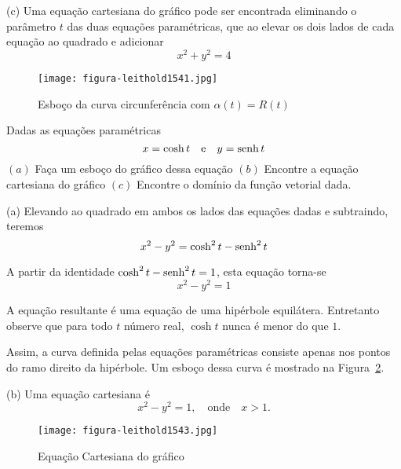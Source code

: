 (c) Uma equação cartesiana do gráfico pode ser encontrada eliminando o parâmetro \(t\) das duas equações paramétricas, que ao elevar os dois lados de cada equação ao quadrado e adicionar
\begin{equation*}
x^{2} + y^{2} = 4
\end{equation*}

\begin{figure}[H]
  \centering
  \texttt{[image: figura-leithold1541.jpg]}
  \caption{Esboço da curva circunferência com \(\alpha(t)=R(t)\)}\label{fig:1541}
\end{figure}


\begin{exc}\label{exer:5-03}
Dadas as equações paramétricas
\begin{equation*}
  x=\cosh t \quad \text{e}\quad y = \operatorname{senh} t
\end{equation*}
\((a)\) Faça um esboço do gráfico dessa equação \((b)\) Encontre a equação cartesiana do gráfico \((c)\) Encontre o domínio
da função vetorial dada.
\end{exc}

\solo
(a) Elevando ao quadrado em ambos os lados das equações dadas e subtraindo, teremos
\begin{equation*}
x^{2}-y^{2} = \cosh^{2} t - \operatorname{senh}^{2} t
\end{equation*}

A partir da identidade \(\cosh^{2} t - \operatorname{senh}^{2} t = 1\), esta equação torna-se
\begin{equation*}
x^{2}-y^{2} = 1
\end{equation*}

A equação resultante é uma equação de uma hipérbole equilátera. Entretanto observe que para todo \(t\) número real,
\(\cosh t\) nunca é menor do que \(1\).

Assim, a curva definida pelas equações paramétricas consiste apenas nos pontos do ramo direito da hipérbole. Um esboço dessa curva é mostrado na Figura~\ref{fig:1543}.

(b) Uma equação cartesiana é
\begin{equation*}
x^{2} - y^{2} = 1, \quad  \text{onde} \quad  x> 1.
\end{equation*}

\begin{figure}[H]
  \centering
  \texttt{[image: figura-leithold1543.jpg]}
  \caption{Equação Cartesiana do gráfico}\label{fig:1543}
\end{figure}


